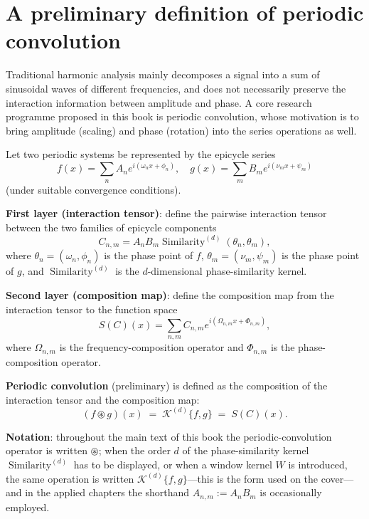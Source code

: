 \section*{A preliminary definition of periodic convolution}

Traditional harmonic analysis mainly decomposes a signal into a sum of sinusoidal waves of different frequencies, and does not necessarily preserve the interaction information between amplitude and phase. A core research programme proposed in this book is periodic convolution, whose motivation is to bring amplitude (scaling) and phase (rotation) into the series operations as well.

\begin{definition}
Let two periodic systems be represented by the epicycle series
\[
f(x) = \sum_{n} A_n e^{i(\omega_n x + \phi_n)}, \quad g(x) = \sum_{m} B_m e^{i(\nu_m x + \psi_m)}
\]
(under suitable convergence conditions).

\textbf{First layer (interaction tensor)}: define the pairwise interaction tensor between the two families of epicycle components
\[
C_{n,m} = A_n B_m \operatorname{Similarity}^{(d)}(\theta_n, \theta_m),
\]
where $\theta_n = (\omega_n, \phi_n)$ is the phase point of $f$, $\theta_m = (\nu_m, \psi_m)$ is the phase point of $g$, and $\operatorname{Similarity}^{(d)}$ is the $d$-dimensional phase-similarity kernel.

\textbf{Second layer (composition map)}: define the composition map from the interaction tensor to the function space
\[
S(C)(x) = \sum_{n,m} C_{n,m} e^{i(\Omega_{n,m} x + \Phi_{n,m})},
\]
where $\Omega_{n,m}$ is the frequency-composition operator and $\Phi_{n,m}$ is the phase-composition operator.

\textbf{Periodic convolution} (preliminary) is defined as the composition of the interaction tensor and the composition map:
\[
(f \circledast g)(x) \;=\; \mathcal{K}^{(d)}\{f,g\} \;=\; S(C)(x).
\]
\end{definition}

\textbf{Notation}: throughout the main text of this book the periodic-convolution operator is written $\circledast$; when the order $d$ of the phase-similarity kernel $\operatorname{Similarity}^{(d)}$ has to be displayed, or when a window kernel $W$ is introduced, the same operation is written $\mathcal{K}^{(d)}\{f,g\}$---this is the form used on the cover---and in the applied chapters the shorthand $A_{n,m} := A_n B_m$ is occasionally employed.

